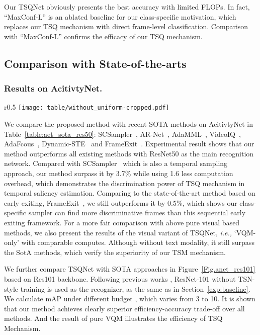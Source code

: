 \documentclass[runningheads]{llncs}
\newcommand{\figref}[1]{Figure~\ref{#1}}
\newcommand{\tabref}[1]{Table~\ref{#1}}
\newcommand{\secref}[1]{Section~\ref{#1}}
\begin{document}
 Our TSQNet obviously presents the best accuracy with limited FLOPs. In fact, ``MaxConf-L'' is an ablated baseline for our class-specific motivation, which replaces our TSQ mechanism with direct frame-level classification. Comparison with ``MaxConf-L'' confirms the efficacy of our TSQ mechanism.


\subsection{Comparison with State-of-the-arts}
\label{exp:sota}

\subsubsection{Results on AcitivtyNet.}
\begin{wrapfigure}{r}{0.5\textwidth} \centering \texttt{[image: table/without\_uniform-cropped.pdf]} \caption{Comparison of the pure VQM and the whole TSQNet with the state-of-the-art based on ResNet-101 recognition network on ActivityNet.} \label{Fig.anet_res101} \end{wrapfigure}
We compare the proposed method with recent SOTA methods on AcitivtyNet in \tabref{table:aet_sota_res50}: SCSampler~\cite{scsampler19}, AR-Net~\cite{arnet}, AdaMML~\cite{adamml}, VideoIQ~\cite{videoiq}, AdaFcous~\cite{adafocus}, Dynamic-STE~\cite{dynamicSTE} and FrameExit~\cite{frameexit}.
Experimental result shows that our method 
outperforms all existing methods with ResNet50 as the main recognition network. 
Compared with SCSampler~\cite{scsampler19} which is also a temporal sampling approach, our method surpass it by 3.7\% while using 1.6 less computation overhead, which demonstrates the discrimination power of TSQ mechanism in temporal saliency estimation.
Comparing to the state-of-the-art method based on early exiting, FrameExit~\cite{frameexit}, we still outperforms it by 0.5\%, which shows our class-specific sampler can find more discriminative frames than this sequential early exiting framework. For a more fair comparison with above pure visual based methods, we also present the results of the visual variant of TSQNet, \emph{i.e.,} `VQM-only' with comparable computes. Although without text modality, it still surpass the SotA methods, which verify the superiority of our TSM mechanism.




We further compare TSQNet with SOTA approaches in \figref{Fig.anet_res101} based on Res101 backbone. Following previous works \cite{adaframe,liteeval,listentolook,marl}, ResNet-101 without TSN-style training is used as the recognizer, as the same as in \secref{exp:baseline}. We calculate mAP under different budget , which varies from 3 to 10.
It is shown that our method achieves clearly superior efficiency-accuracy trade-off over all methods. And the result of pure VQM illustrates the efficiency of TSQ Mechanism.
\end{document}
